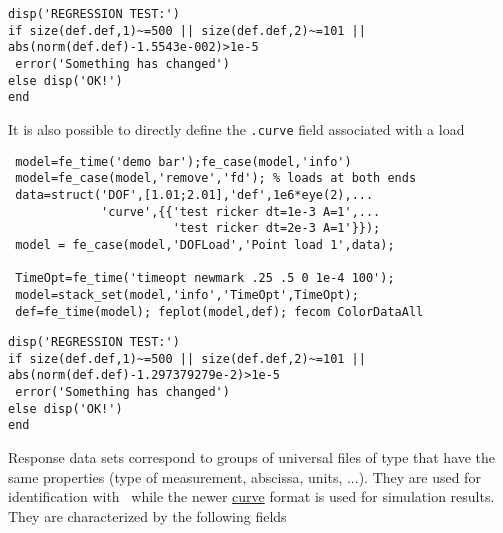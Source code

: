 \begin{SDTDEV}
\begin{verbatim}
disp('REGRESSION TEST:')
if size(def.def,1)~=500 || size(def.def,2)~=101 || abs(norm(def.def)-1.5543e-002)>1e-5
 error('Something has changed')
else disp('OK!')
end
\end{verbatim}%
\end{SDTDEV}

It is also possible to directly define the {\tt .curve} field associated with a load

\begin{verbatim}
 model=fe_time('demo bar');fe_case(model,'info')
 model=fe_case(model,'remove','fd'); % loads at both ends
 data=struct('DOF',[1.01;2.01],'def',1e6*eye(2),...
             'curve',{{'test ricker dt=1e-3 A=1',...
                       'test ricker dt=2e-3 A=1'}});
 model = fe_case(model,'DOFLoad','Point load 1',data);

 TimeOpt=fe_time('timeopt newmark .25 .5 0 1e-4 100');
 model=stack_set(model,'info','TimeOpt',TimeOpt);
 def=fe_time(model); feplot(model,def); fecom ColorDataAll
\end{verbatim}%

\begin{SDTDEV}
\begin{verbatim}
disp('REGRESSION TEST:')
if size(def.def,1)~=500 || size(def.def,2)~=101 || abs(norm(def.def)-1.297379279e-2)>1e-5
 error('Something has changed')
else disp('OK!')
end
\end{verbatim}%
\end{SDTDEV}


Response data sets  correspond to groups of universal files of type  that have the same properties (type of measurement, abscissa, units, ...). They are used for identification with \idcom\ while the newer \hyperlink{curve}{curve} format is used for simulation results. They are characterized by the following fields

